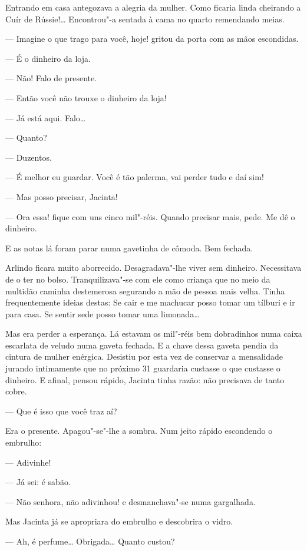 \begin{linenumbers}
Entrando em casa antegozava a alegria da mulher. Como ficaria linda
cheirando a Cuír de Rússie!\ldots{} Encontrou"-a sentada à cama no quarto
remendando meias.

--- Imagine o que trago para você, hoje! gritou da porta com as mãos
escondidas.

--- É o dinheiro da loja.

--- Não! Falo de presente.

--- Então você não trouxe o dinheiro da loja!

--- Já está aqui. Falo\ldots{}

--- Quanto?

--- Duzentos.

--- É melhor eu guardar. Você é tão palerma, vai perder tudo e daí sim!

--- Mas posso precisar, Jacinta!

--- Ora essa! fique com uns cinco mil"-réis. Quando precisar mais, pede.
Me dê o dinheiro.

E as notas lá foram parar numa gavetinha de cômoda. Bem fechada.

Arlindo ficara muito aborrecido. Desagradava"-lhe viver sem dinheiro.
Necessitava de o ter no bolso. Tranquilizava"-se com ele como criança que
no meio da multidão caminha destemerosa segurando a mão de pessoa mais
velha. Tinha frequentemente ideias destas: Se cair e me machucar posso
tomar um tílburi e ir para casa. Se sentir sede posso tomar uma
limonada\ldots{}

Mas era perder a esperança. Lá estavam os mil"-réis bem dobradinhos numa
caixa escarlata de veludo numa gaveta fechada. E a chave dessa gaveta
pendia da cintura de mulher enérgica. Desistiu por esta vez de conservar
a mensalidade jurando intimamente que no próximo 31 guardaria custasse o
que custasse o dinheiro. E afinal, pensou rápido, Jacinta tinha razão:
não precisava de tanto cobre.

--- Que é isso que você traz aí?

Era o presente. Apagou"-se"-lhe a sombra. Num jeito rápido escondendo o
embrulho:

--- Adivinhe!

--- Já sei: é sabão.

--- Não senhora, não adivinhou! e desmanchava"-se numa gargalhada.

Mas Jacinta já se apropriara do embrulho e descobrira o vidro.

--- Ah, é perfume\ldots{} Obrigada\ldots{} Quanto custou?


\end{linenumbers}
